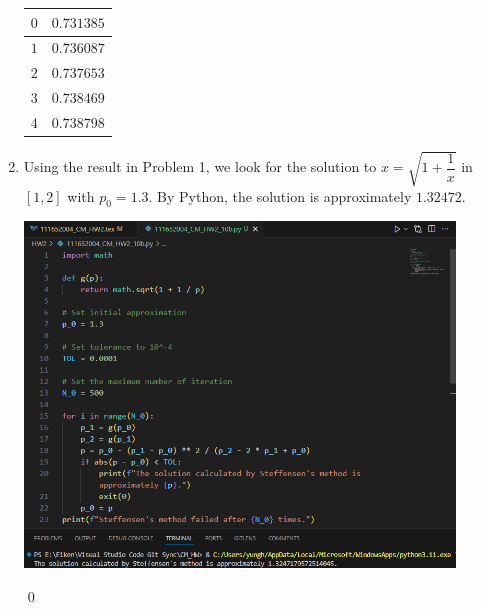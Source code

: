 \documentclass[11pt]{article}
\theoremstyle{break}
\numberwithin{equation}{theorem}
\begin{document}
\begin{enumerate}
\begin{center}
\begin{tabular}{|c|c|}
            $0$ & $0.731385$ \\
            \hline
            $1$ & $0.736087$ \\
            \hline
            $2$ & $0.737653$ \\
            \hline
            $3$ & $0.738469$ \\
            \hline
            $4$ & $0.738798$ \\
            \hline
        \end{tabular}
    \end{center}
    \item Using the result in Problem 1, we look for the solution to $x=\sqrt{1+\dfrac{1}{x}}$ in $[1, 2]$ with $p_0=1.3$. By Python, the solution is approximately $1.32472$.
    \begin{center}
        \includegraphics[width=0.9\textwidth]{problem_10b_py.png}
    \end{center}
    \qed
\end{enumerate}
\end{document}

